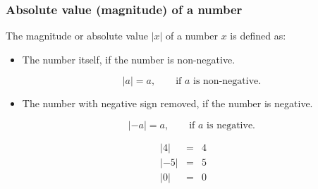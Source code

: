 \begin{frame}
\frametitle{Absolute value (magnitude) of a number}
\begin{definition}
The magnitude or absolute value $|x|$ of a number $x$ is defined as:
\begin{itemize}
\item The number itself, if the number is non-negative.

\[ 
|a | = a, \quad \quad \text{if }a\text{ is non-negative.}
\]
\item The number with negative sign removed, if the number is negative.

\[|-a | = a , \quad \quad \text{if }a \text{ is negative.}\]

\end{itemize}

\end{definition}
\begin{example}
\[
\begin{array}{rcl}
|4| &=& 4\\
|-5|&=& 5\\
|0| &=& 0
\end{array}
\]
\end{example}

\end{frame}
